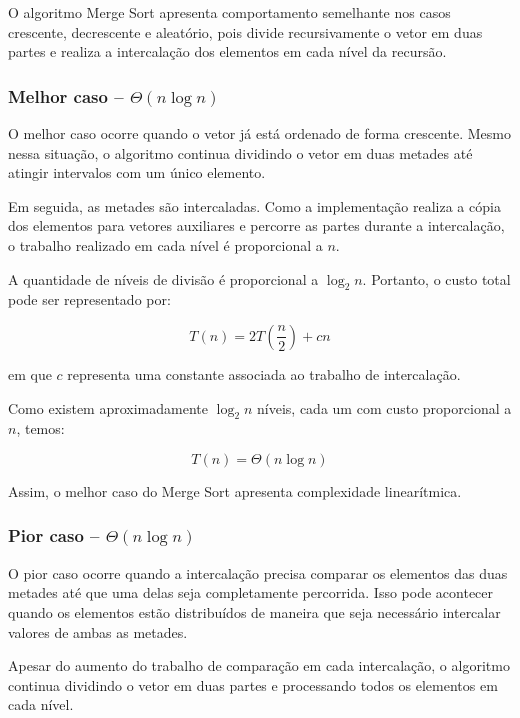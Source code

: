 O algoritmo Merge Sort apresenta comportamento semelhante nos casos
crescente, decrescente e aleatório, pois divide recursivamente o vetor
em duas partes e realiza a intercalação dos elementos em cada nível
da recursão.

\subsubsection{Melhor caso -- $\Theta(n\log n)$}

O melhor caso ocorre quando o vetor já está ordenado de forma crescente.
Mesmo nessa situação, o algoritmo continua dividindo o vetor em duas
metades até atingir intervalos com um único elemento.

Em seguida, as metades são intercaladas. Como a implementação realiza
a cópia dos elementos para vetores auxiliares e percorre as partes
durante a intercalação, o trabalho realizado em cada nível é
proporcional a $n$.

A quantidade de níveis de divisão é proporcional a $\log_2 n$.
Portanto, o custo total pode ser representado por:

\begin{equation}
T(n) = 2T\left(\frac{n}{2}\right) + cn
\end{equation}

em que $c$ representa uma constante associada ao trabalho de
intercalação.

Como existem aproximadamente $\log_2 n$ níveis, cada um com custo
proporcional a $n$, temos:

\begin{equation}
T(n) = \Theta(n\log n)
\end{equation}

Assim, o melhor caso do Merge Sort apresenta complexidade
linearítmica.

\subsubsection{Pior caso -- $\Theta(n\log n)$}

O pior caso ocorre quando a intercalação precisa comparar os elementos
das duas metades até que uma delas seja completamente percorrida.
Isso pode acontecer quando os elementos estão distribuídos de maneira
que seja necessário intercalar valores de ambas as metades.

Apesar do aumento do trabalho de comparação em cada intercalação, o
algoritmo continua dividindo o vetor em duas partes e processando todos
os elementos em cada nível.

